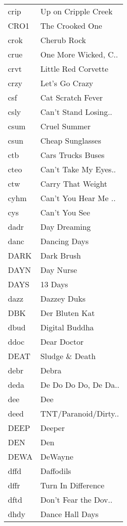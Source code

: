 \begin{supertabular}{ll}
 crip &   Up on Cripple Creek \\
 CRO1 &       The Crooked One \\
 crok &           Cherub Rock \\
 crue &  One More Wicked, C.. \\
 crvt &   Little Red Corvette \\
 crzy &        Let's Go Crazy \\
  csf &     Cat Scratch Fever \\
 csly &  Can't Stand Losing.. \\
 csum &          Cruel Summer \\
 csun &      Cheap Sunglasses \\
  ctb &     Cars Trucks Buses \\
 cteo &  Can't Take My Eyes.. \\
  ctw &     Carry That Weight \\
 cyhm &  Can't You Hear Me .. \\
  cys &         Can't You See \\
 dadr &          Day Dreaming \\
 danc &          Dancing Days \\
 DARK &            Dark Brush \\
 DAYN &             Day Nurse \\
 DAYS &               13 Days \\
 dazz &           Dazzey Duks \\
  DBK &        Der Bluten Kat \\
 dbud &        Digital Buddha \\
 ddoc &           Dear Doctor \\
 DEAT &        Sludge \& Death \\
 debr &                 Debra \\
 deda &  De Do Do Do, De Da.. \\
  dee &                   Dee \\
 deed &  TNT/Paranoid/Dirty.. \\
 DEEP &                Deeper \\
  DEN &                   Den \\
 DEWA &               DeWayne \\
 dffd &             Daffodils \\
 dffr &    Turn In Difference \\
 dftd &  Don't Fear the Dov.. \\
 dhdy &       Dance Hall Days \\

\end{supertabular}
